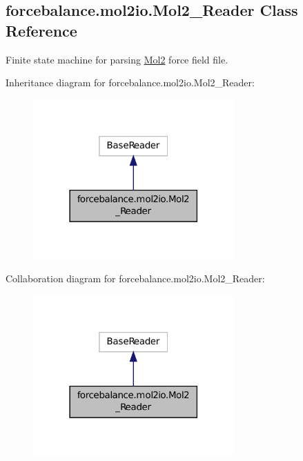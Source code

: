 \hypertarget{classforcebalance_1_1mol2io_1_1Mol2__Reader}{\subsection{forcebalance.\-mol2io.\-Mol2\-\_\-\-Reader Class Reference}
\label{classforcebalance_1_1mol2io_1_1Mol2__Reader}
}


Finite state machine for parsing \hyperlink{namespaceforcebalance_1_1Mol2}{Mol2} force field file.  




Inheritance diagram for forcebalance.\-mol2io.\-Mol2\-\_\-\-Reader\-:\nopagebreak
\begin{figure}[H]
\begin{center}
\leavevmode
\includegraphics[width=218pt]{classforcebalance_1_1mol2io_1_1Mol2__Reader__inherit__graph}
\end{center}
\end{figure}


Collaboration diagram for forcebalance.\-mol2io.\-Mol2\-\_\-\-Reader\-:\nopagebreak
\begin{figure}[H]
\begin{center}
\leavevmode
\includegraphics[width=218pt]{classforcebalance_1_1mol2io_1_1Mol2__Reader__coll__graph}
\end{center}
\end{figure}
